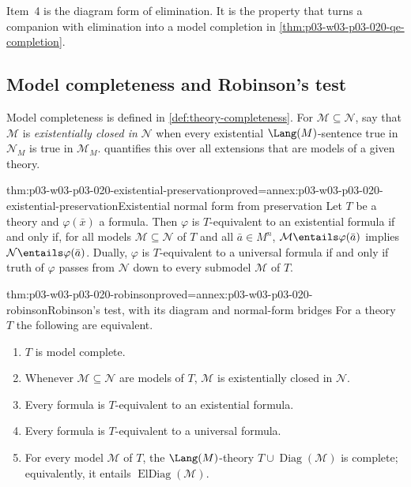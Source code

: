 Item~4 is the diagram form of elimination. It is the property that turns a
companion with elimination into a model completion in
\cref{thm:p03-w03-p03-020-qe-completion}.

\subsection{Model completeness and Robinson's test}
\label{sec:p03-w03-p03-020-robinson}

Model completeness is defined in \cref{def:theory-completeness}. For
\(\mathcal M\subseteq\mathcal N\), say that \(\mathcal M\) is
\emph{existentially closed in} \(\mathcal N\) when every existential
\(\Lang(M)\)-sentence true in \(\mathcal N_M\) is true in \(\mathcal M_M\).
 quantifies this over all extensions that
are models of a given theory.

\begin{hblemma}{thm:p03-w03-p03-020-existential-preservation}{proved=annex:p03-w03-p03-020-existential-preservation}{Existential normal form from preservation}
Let \(T\) be a theory and \(\varphi(\bar x)\) a formula. Then
\(\varphi\) is \(T\)-equivalent to an existential formula if and only if,
for all models \(\mathcal M\subseteq\mathcal N\) of \(T\) and all
\(\bar a\in M^n\), \(\mathcal M\entails\varphi(\bar a)\) implies
\(\mathcal N\entails\varphi(\bar a)\). Dually, \(\varphi\) is
\(T\)-equivalent to a universal formula if and only if truth of
\(\varphi\) passes from \(\mathcal N\) down to every submodel
\(\mathcal M\) of \(T\).
\end{hblemma}

\begin{hbtheorem}{thm:p03-w03-p03-020-robinson}{proved=annex:p03-w03-p03-020-robinson}{Robinson's test, with its diagram and normal-form bridges}
For a theory \(T\) the following are equivalent.
\begin{enumerate}
\item \(T\) is model complete.
\item Whenever \(\mathcal M\subseteq\mathcal N\) are models of \(T\),
  \(\mathcal M\) is existentially closed in \(\mathcal N\).
\item Every formula is \(T\)-equivalent to an existential formula.
\item Every formula is \(T\)-equivalent to a universal formula.
\item For every model \(\mathcal M\) of \(T\), the \(\Lang(M)\)-theory
  \(T\cup\operatorname{Diag}(\mathcal M)\) is complete; equivalently, it
  entails \(\operatorname{ElDiag}(\mathcal M)\).
\end{enumerate}
\end{hbtheorem}

